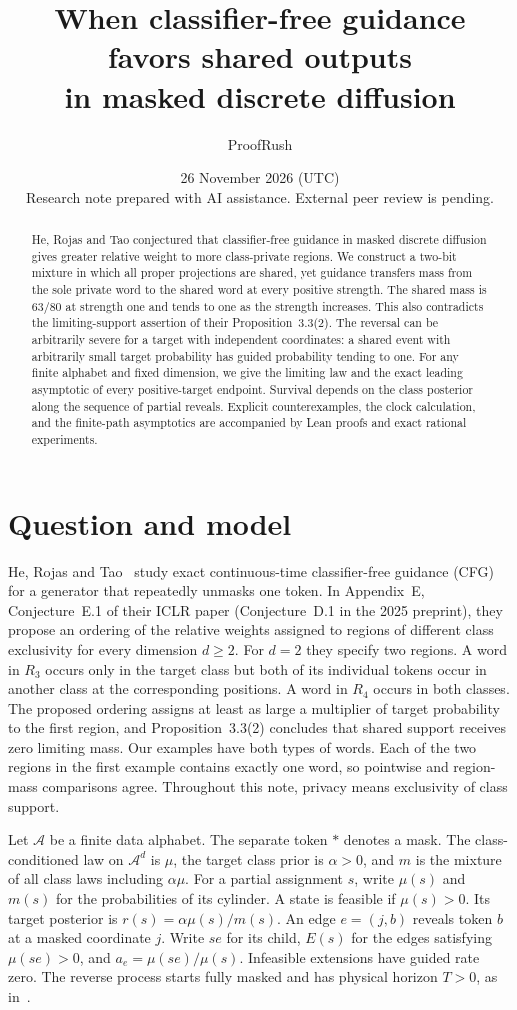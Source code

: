 \documentclass[11pt]{article}
\title{When classifier-free guidance favors shared outputs\\in masked discrete diffusion}
\author{ProofRush}
\date{26 November 2026 (UTC)\\\small Research note prepared with AI assistance. External peer review is pending.}
\newcommand{\mask}{\mathord{*}}
\begin{document}
\maketitle
\begin{abstract}
He, Rojas and Tao conjectured that classifier-free guidance in masked discrete diffusion gives greater relative weight to more class-private regions. We construct a two-bit mixture in which all proper projections are shared, yet guidance transfers mass from the sole private word to the shared word at every positive strength. The shared mass is \(63/80\) at strength one and tends to one as the strength increases. This also contradicts the limiting-support assertion of their Proposition~3.3(2). The reversal can be arbitrarily severe for a target with independent coordinates: a shared event with arbitrarily small target probability has guided probability tending to one. For any finite alphabet and fixed dimension, we give the limiting law and the exact leading asymptotic of every positive-target endpoint. Survival depends on the class posterior along the sequence of partial reveals. Explicit counterexamples, the clock calculation, and the finite-path asymptotics are accompanied by Lean proofs and exact rational experiments.
\end{abstract}

\section{Question and model}
He, Rojas and Tao~\cite{he} study exact continuous-time classifier-free guidance (CFG) for a generator that repeatedly unmasks one token. In Appendix~E, Conjecture~E.1 of their ICLR paper (Conjecture~D.1 in the 2025 preprint), they propose an ordering of the relative weights assigned to regions of different class exclusivity for every dimension \(d\ge2\). For \(d=2\) they specify two regions. A word in \(R_3\) occurs only in the target class but both of its individual tokens occur in another class at the corresponding positions. A word in \(R_4\) occurs in both classes. The proposed ordering assigns at least as large a multiplier of target probability to the first region, and Proposition~3.3(2) concludes that shared support receives zero limiting mass. Our examples have both types of words. Each of the two regions in the first example contains exactly one word, so pointwise and region-mass comparisons agree. Throughout this note, privacy means exclusivity of class support.

Let \(\mathcal A\) be a finite data alphabet. The separate token \(\mask\) denotes a mask. The class-conditioned law on \(\mathcal A^d\) is \(\mu\), the target class prior is \(\alpha>0\), and \(m\) is the mixture of all class laws including \(\alpha\mu\). For a partial assignment \(s\), write \(\mu(s)\) and \(m(s)\) for the probabilities of its cylinder. A state is feasible if \(\mu(s)>0\). Its target posterior is \(r(s)=\alpha\mu(s)/m(s)\). An edge \(e=(j,b)\) reveals token \(b\) at a masked coordinate \(j\). Write \(se\) for its child, \(E(s)\) for the edges satisfying \(\mu(se)>0\), and \(a_e=\mu(se)/\mu(s)\). Infeasible extensions have guided rate zero. The reverse process starts fully masked and has physical horizon \(T>0\), as in~\cite[Eq.~(5)]{he}.
\end{document}
